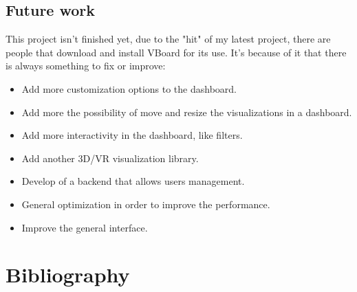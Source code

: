 \documentclass[a4paper, 12pt]{book}
\begin{document}
\section{Future work}
\label{sec:fw}

This project isn’t finished yet, due to the "hit" of my latest project, there are people that download and install VBoard for its use. It’s because of it that there is always something to fix or improve:

\begin{itemize}
\item Add more customization options to the dashboard.
\item Add more the possibility of move and resize the visualizations in a dashboard.
\item Add more interactivity in the dashboard, like filters.
\item Add another 3D/VR visualization library.
\item Develop of a backend that allows users management.
\item General optimization in order to improve the performance.
\item Improve the general interface.
\end{itemize}




\chapter{Bibliography}
\label{sec:bib}
\end{document}
